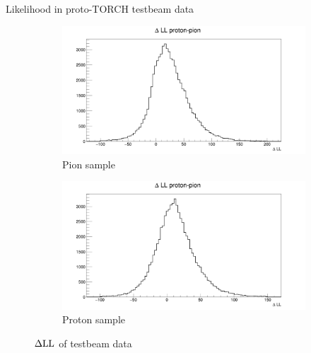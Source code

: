 \documentclass{beamer}
\begin{document}
\begin{frame}{Likelihood in proto-TORCH testbeam data}
  \begin{figure}
    \centering
    \vspace{-0.2cm}
    \begin{subfigure}{0.5\textwidth}
      \includegraphics[width = 1.0\textwidth]{Plots/TestBeamDLLPion.png}
      \caption{Pion sample}
    \end{subfigure}%
    \begin{subfigure}{0.5\textwidth}
      \includegraphics[width = 1.0\textwidth]{Plots/TestBeamDLLProton.png}
      \caption{Proton sample}
    \end{subfigure}
    \caption{$\Delta{\rm LL}$ of testbeam data}
  \end{figure}
\end{frame}
\end{document}
